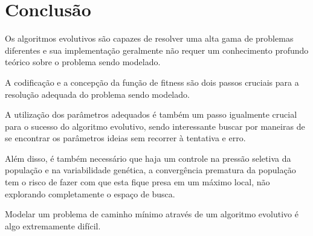 \documentclass[12pt]{article}
\begin{document}
\section{Conclusão}

Os algoritmos evolutivos são capazes de resolver uma alta gama de problemas diferentes e 
sua implementação geralmente não requer um conhecimento profundo teórico sobre o problema 
sendo modelado.

A codificação e a concepção da função de fitness são dois passos cruciais para a resolução 
adequada do problema sendo modelado.

A utilização dos parâmetros adequados é também um passo igualmente crucial para o sucesso 
do algoritmo evolutivo, sendo interessante buscar por maneiras de se encontrar os 
parâmetros ideias sem recorrer à tentativa e erro.

Além disso, é também necessário que haja um controle na pressão seletiva da população e 
na variabilidade genética, a convergência prematura da população tem o risco de fazer 
com que esta fique presa em um máximo local, não explorando completamente o espaço de 
busca.

Modelar um problema de caminho mínimo através de um algoritmo evolutivo é algo 
extremamente difícil.

%
%
\end{document}
